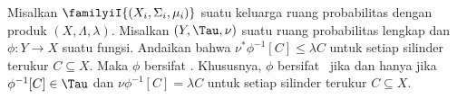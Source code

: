  Misalkan $\familyiI{(X_i,\Sigma_i,\mu_i)}$ suatu
keluarga
ruang probabilitas dengan produk $(X,\Lambda,\lambda)$. Misalkan
$(Y,\Tau,\nu)$ suatu ruang probabilitas lengkap dan $\phi:Y\to X$ suatu
fungsi.
Andaikan bahwa $\nu^*\phi^{-1}[C]\le\lambda C$ untuk setiap silinder terukur
$C\subseteq X$. Maka $\phi$ bersifat \imp.
Khususnya, $\phi$ bersifat \imp\ jika dan hanya jika $\phi^{-1}[C]\in\Tau$ dan
$\nu\phi^{-1}[C]=\lambda C$ untuk setiap silinder
terukur $C\subseteq X$.


